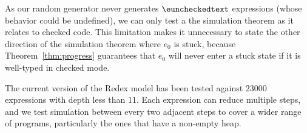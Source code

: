 
As our random generator never generates
$\euncheckedtext$ expressions (whose behavior could be undefined), we can only test a the simulation theorem 
as it relates to checked code. This limitation makes it
unnecessary to state the other direction of the simulation theorem
where $e_0$ is stuck, because Theorem~\ref{thm:progress} guarantees
that $e_0$ will never enter a stuck state if it is well-typed in
checked mode.

The current version of the Redex model has been tested against $23000$
expressions with depth less than $11$. Each expression can
reduce multiple steps, and we test simulation between every two
adjacent steps to cover a wider range of programs, particularly the
ones that have a non-empty heap.


